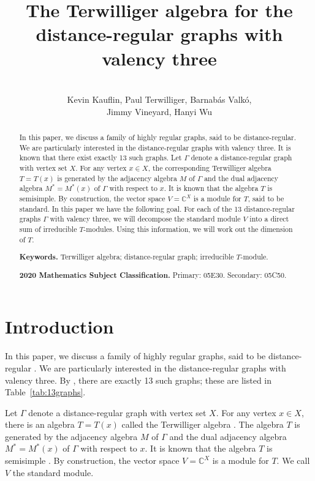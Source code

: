 \documentclass[12pt,letterpaper]{article}
\title{\textbf{The Terwilliger algebra for the distance-regular graphs with valency three}}
\author{\\ Kevin Kauflin, Paul Terwilliger, Barnab\'as Valk\'o,\\ Jimmy Vineyard, Hanyi Wu}
\date{}
\begin{document}
\maketitle

\begin{abstract}
In this paper, we discuss a family of highly regular graphs, said to be distance-regular. We are particularly interested in the distance-regular graphs with valency three. It is known that there exist exactly 13 such graphs. Let $\Gamma$ denote a distance-regular graph with vertex set $X$. For any vertex $x \in X$, the corresponding Terwilliger algebra $T=T(x)$ is generated by the adjacency algebra $M$ of $\Gamma$ and the dual adjacency algebra $M^*=M^*(x)$ of $\Gamma$ with respect to $x$. It is known that the algebra $T$ is semisimple. By construction, the vector space $V=\mathbb{C}^X$ is a module for $T$, said to be standard. In this paper we have the following goal. For each of the 13 distance-regular graphs $\Gamma$ with valency three, we will decompose the standard module $V$ into a direct sum of irreducible $T$-modules. Using this information, we will work out the dimension of $T$.

\vspace{0.5cm}
\noindent\textbf{Keywords.} Terwilliger algebra; distance-regular graph; irreducible $T$-module.

\noindent\textbf{2020 Mathematics Subject Classification.} Primary: 05E30. Secondary: 05C50.
\end{abstract}





\section{Introduction}


In this paper, we discuss a family of highly regular graphs, said to be distance-regular \cite{bannaiitotanaka,bannaiito1984,brouwer}. We are particularly interested in the distance-regular graphs with valency three. By \cite[Theorem~7.5.1]{brouwer}, there are exactly 13 such graphs; these are listed in Table~\ref{tab:13graphs}. 


Let $\Gamma$ denote a distance-regular graph with vertex set $X$. For any vertex $x\in X$, there is an algebra $T=T(x)$ called the Terwilliger algebra \cite{terwilliger2022,Terwilliger1992}. The algebra $T$ is generated by the adjacency algebra $M$ of $\Gamma$ and the dual adjacency algebra $M^*=M^*(x)$ of $\Gamma$ with respect to $x$. It is known that the algebra $T$ is semisimple \cite[Sec.\ 1]{Egge2000}. By construction, the vector space $V=\mathbb{C}^X$ is a module for $T$. We call $V$ the standard module.
\end{document}
